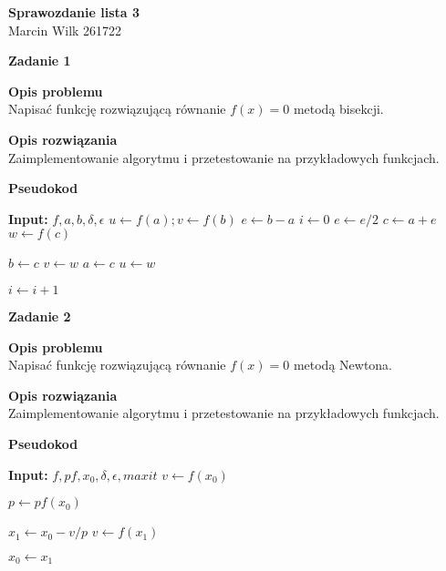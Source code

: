 \documentclass{article}
\begin{document}
\begin{center}
	\textbf{\LARGE Sprawozdanie lista 3} \\
	{\large Marcin Wilk 261722} \\

\end{center}

\noindent \textbf{\large Zadanie 1}

\noindent \textbf{Opis problemu} \\
Napisać funkcję rozwiązującą równanie $f(x)=0$ metodą bisekcji.

\noindent \textbf{Opis rozwiązania} \\
Zaimplementowanie algorytmu i przetestowanie na przykładowych funkcjach.

\noindent \textbf{Pseudokod}

\begin{algorithmic}
	\State \textbf{Input:} $f, a, b, \delta, \epsilon$
	\State $u \gets f(a); v \gets f(b)$
	\State {}
	\EndIf
	\State $e \gets b - a$
	\State $i \gets 0$
	\Loop
	\State $e \gets e/2$
	\State $c \gets a+e$
	\State $w \gets f(c)$

	\State {}
	\EndIf

	\State $b \gets c$
	\State $v \gets w$
	\Else
	\State $a \gets c$
	\State $u \gets w$
	\EndIf

	\State $i \gets i + 1$
	\EndLoop
\end{algorithmic}

\noindent \textbf{\large Zadanie 2}

\noindent \textbf{Opis problemu} \\
Napisać funkcję rozwiązującą równanie $f(x)=0$ metodą Newtona.

\noindent \textbf{Opis rozwiązania} \\
Zaimplementowanie algorytmu i przetestowanie na przykładowych funkcjach.

\pagebreak

\noindent \textbf{Pseudokod}
\begin{algorithmic}
	\State \textbf{Input:} $f, pf, x_0, \delta, \epsilon, maxit$
	\State $v \gets f(x_0)$

	\State {}
	\EndIf

	\State $p \gets pf(x_0)$

	\State {}
	\EndIf

	\State $x_1 \gets x_0 - v / p$
	\State $v \gets f(x_1)$

	\State {}
	\EndIf

	\State $x_0 \gets x_1$
	\EndFor

	\State {}
\end{algorithmic}
\end{document}
